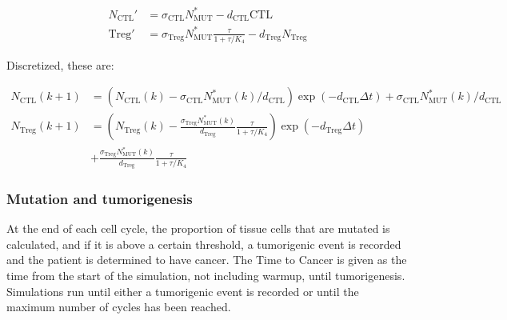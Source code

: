 \documentclass[11pt]{article}
\begin{document}
\begin{equation}\tag{2.9}
\begin{split}
N_\text{CTL}' & = \sigma_{\text{CTL}}N_{\text{MUT}}^* - d_{\text{CTL}}\text{CTL} \\
\text{Treg}' & = \sigma_{\text{Treg}}N_{\text{MUT}}^* \frac{\tau}{1+\tau/K_4}- d_{\text{Treg}}N_\text{Treg}
\end{split}
\end{equation}

Discretized, these are:

\begin{equation}\tag{2.10}
\begin{split}
N_\text{CTL}(k+1) & =  \left (N_\text{CTL}(k)-\sigma_{\text{CTL}}N_{\text{MUT}}^*(k)/d_{\text{CTL}}\right )\exp(- d_{\text{CTL}}\Delta t) + \sigma_{\text{CTL}}N_{\text{MUT}}^*(k)/d_{\text{CTL}}\\
N_\text{Treg}(k+1) & =  \left (N_\text{Treg}(k)-\frac{\sigma_{\text{Treg}}N_{\text{MUT}}^*(k)}{d_{\text{Treg}}} \frac{\tau}{1+\tau/K_4}\right )\exp(-d_{\text{Treg}}\Delta t)\\
&+ \frac{\sigma_{\text{Treg}}N_{\text{MUT}}^*(k)}{d_{\text{Treg}}} \frac{\tau}{1+\tau/K_4}
\end{split}
\end{equation}

\subsubsection{Mutation and tumorigenesis}
At the end of each cell cycle, the proportion of tissue cells that are mutated is calculated, and if it is above a certain threshold, a tumorigenic event is recorded and the patient is determined to have cancer.
The Time to Cancer is given as the time from the start of the simulation, not including warmup, until tumorigenesis.
Simulations run until either a tumorigenic event is recorded or until the maximum number of cycles has been reached.
\end{document}
